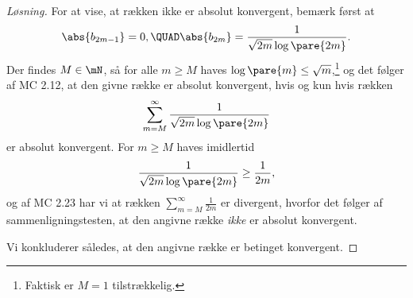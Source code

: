 \begin{opg}
\begin{enumerate}
\begin{proof}[Løsning]
    For at vise, at rækken ikke er absolut konvergent, bemærk først at
    $$ \abs{b_{2m-1}} = 0, \QUAD
        \abs{b_{2m}} = \frac{1}{\sqrt{2m}\log\pare{2m}}. $$
    Der findes $M\in\mN$, så for alle $m\geq M$ haves $\log\pare{m}\leq \sqrt{m}$,\footnote{Faktisk er $M=1$ tilstrækkelig.} og det følger af MC 2.12, at den givne række er absolut konvergent, hvis og kun hvis rækken
    $$ \sum_{m = M}^\infty \frac{1}{\sqrt{2m}\log\pare{2m}} $$
    er absolut konvergent. For $m\geq M$ haves imidlertid 
    $$ \frac{1}{\sqrt{2m}\log\pare{2m}} \geq \frac{1}{2m}, $$
    og af MC 2.23 har vi at rækken $\sum_{m=M}^\infty \frac{1}{2m}$ er divergent, hvorfor det følger af sammenligningstesten, at den angivne række \textit{ikke} er absolut konvergent.
    
    Vi konkluderer således, at den angivne række er betinget konvergent.
    \end{proof}
\end{enumerate}
\end{opg}

